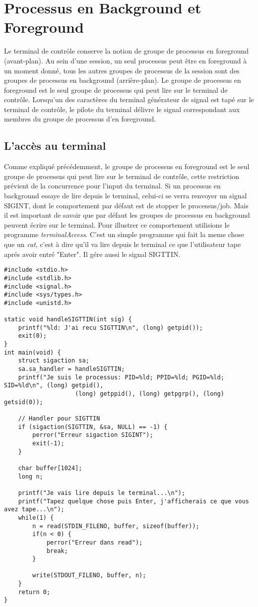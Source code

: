 \section{Processus en Background et Foreground}

Le terminal de contrôle conserve la notion de groupe de processus en foreground (avant-plan). Au sein d'une session, un seul processus peut être en foreground
à un moment donné, tous les autres groupes de processus de la session sont des groupes de processus en background (arrière-plan). Le groupe de processus en foreground
est le seul groupe de processus qui peut lire sur le terminal de contrôle. Lorsqu'un des caractères du terminal générateur de signal est tapé sur
le terminal de contrôle, le pilote du terminal délivre le signal correspondant aux membres du groupe de processus d’en foreground.


\subsection{L’accès au terminal}

Comme expliqué précédemment, le groupe de processus en foreground est le seul groupe de processus qui peut lire sur le terminal de contrôle,
cette restriction prévient de la concurrence pour l’input du terminal. Si un processus en background essaye de lire depuis le terminal, celui-ci
se verra renvoyer un signal SIGINT, dont le comportement par défaut est de stopper le processus/job. Mais il est important de savoir que par défaut
les groupes de processus en background peuvent écrire sur le terminal.
\newline
Pour illustrer ce comportement utilisions le programme \textit{terminalAccess}. C'est un simple programme qui fait la meme chose que un \textit{cat}, c'est à dire
qu'il va lire depuis le terminal ce que l'utilisateur tape aprés avoir entré "Enter". Il gére aussi le signal SIGTTIN.

\begin{lstlisting}[caption={terminalAccess.c}, label={terminalAccess.c}]
#include <stdio.h>
#include <stdlib.h>
#include <signal.h>
#include <sys/types.h>
#include <unistd.h>

static void handleSIGTTIN(int sig) {
    printf("%ld: J'ai recu SIGTTIN\n", (long) getpid());
    exit(0);
}
int main(void) {
	struct sigaction sa;
	sa.sa_handler = handleSIGTTIN;
	printf("Je suis le processus: PID=%ld; PPID=%ld; PGID=%ld; SID=%ld\n", (long) getpid(),
                    (long) getppid(), (long) getpgrp(), (long) getsid(0));

	// Handler pour SIGTTIN
    if (sigaction(SIGTTIN, &sa, NULL) == -1) {
		perror("Erreur sigaction SIGINT");
		exit(-1);
	}
        
	char buffer[1024];
	long n;

	printf("Je vais lire depuis le terminal...\n");
	printf("Tapez quelque chose puis Enter, j'afficherais ce que vous avez tape...\n");
	while(1) {
		n = read(STDIN_FILENO, buffer, sizeof(buffer)); 
		if(n < 0) {
			perror("Erreur dans read");
			break;
		}			
		
		write(STDOUT_FILENO, buffer, n);
	}	
	return 0;
}
\end{lstlisting}

